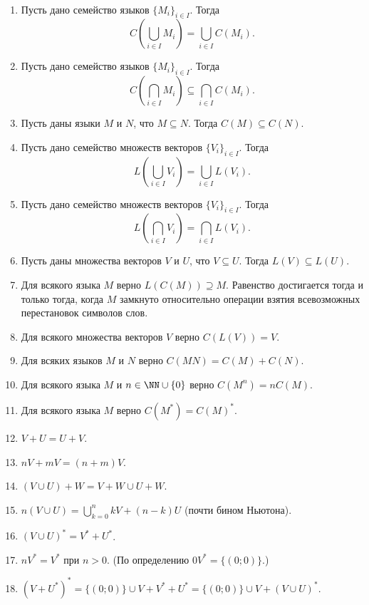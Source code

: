 \documentclass[12pt,a4paper]{article}
\begin{document}
\begin{problem}{8}
\begin{enumerate}
                \begin{lemma}\ 
                    \begin{enumerate}
                        \item Пусть дано семейство языков $\{M_i\}_{i \in I}$. Тогда
                            \[C\left(\bigcup_{i \in I} M_i\right) = \bigcup_{i \in I} C(M_i).\]
                        \item Пусть дано семейство языков $\{M_i\}_{i \in I}$. Тогда
                            \[C\left(\bigcap_{i \in I} M_i\right) \subseteq \bigcap_{i \in I} C(M_i).\]
                        \item Пусть даны языки $M$ и $N$, что $M \subseteq N$. Тогда $C(M) \subseteq C(N)$.
                        \item Пусть дано семейство множеств векторов $\{V_i\}_{i \in I}$. Тогда
                            \[L\left(\bigcup_{i \in I} V_i\right) = \bigcup_{i \in I} L(V_i).\]
                        \item Пусть дано семейство множеств векторов $\{V_i\}_{i \in I}$. Тогда
                            \[L\left(\bigcap_{i \in I} V_i\right) = \bigcap_{i \in I} L(V_i).\]
                        \item Пусть даны множества векторов $V$ и $U$, что $V \subseteq U$. Тогда $L(V) \subseteq L(U)$.
                        \item Для всякого языка $M$ верно $L(C(M)) \supseteq M$. Равенство достигается тогда и только тогда, когда $M$ замкнуто относительно операции взятия всевозможных перестановок символов слов.
                        \item Для всякого множества векторов $V$ верно $C(L(V)) = V$.
                        \item Для всяких языков $M$ и $N$ верно $C(MN) = C(M) + C(N)$.
                        \item Для всякого языка $M$ и $n \in \NN \cup \{0\}$ верно $C(M^n) = nC(M)$.
                        \item Для всякого языка $M$ верно $C(M^*) = C(M)^*$.
                        \item $V + U = U + V$.
                        \item $nV + mV = (n+m)V$.
                        \item $(V \cup U) + W = V + W \cup U + W$.
                        \item $n(V \cup U) = \bigcup_{k = 0}^n kV + (n-k)U$ (почти бином Ньютона).
                        \item $(V \cup U)^* = V^* + U^*$.
                        \item $nV^* = V^*$ при $n > 0$. (По определению $0V^* = \{(0; 0)\}$.)
                        \item $(V + U^*)^* = \{(0; 0)\} \cup V + V^* + U^* = \{(0; 0)\} \cup V + (V \cup U)^*$.
                    \end{enumerate}
                \end{lemma}


\end{enumerate}
\end{problem}
\end{document}
